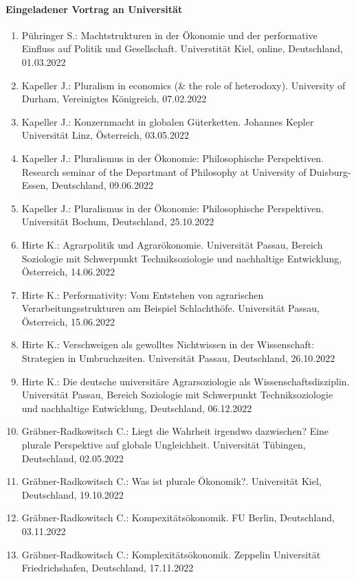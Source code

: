 \paragraph{Eingeladener Vortrag an Universität}
\begin{enumerate}
	\item Pühringer S.: Machtstrukturen in der Ökonomie und der performative Einfluss auf Politik und Gesellschaft. Universtität Kiel, online, Deutschland, 01.03.2022
	\item Kapeller J.: Pluralism in economics (& the role of heterodoxy). University of Durham, Vereinigtes Königreich, 07.02.2022
	\item Kapeller J.: Konzernmacht in globalen Güterketten. Johannes Kepler Universität Linz, Österreich, 03.05.2022
	\item Kapeller J.: Pluralismus in der Ökonomie: Philosophische Perspektiven. Research seminar of the Departmant of Philosophy at University of Duisburg-Essen, Deutschland, 09.06.2022
	\item Kapeller J.: Pluralismus in der Ökonomie: Philosophische Perspektiven. Universität Bochum, Deutschland, 25.10.2022
	\item Hirte K.: Agrarpolitik und Agrarökonomie. Universität Passau, Bereich Soziologie mit Schwerpunkt Techniksoziologie und nachhaltige Entwicklung, Österreich, 14.06.2022
	\item Hirte K.: Performativity: Vom Entstehen von agrarischen Verarbeitungsstrukturen am Beispiel Schlachthöfe. Universität Passau, Österreich, 15.06.2022
	\item Hirte K.: Verschweigen als gewolltes Nichtwissen in der Wissenschaft: Strategien in Umbruchzeiten. Universität Passau, Deutschland, 26.10.2022
	\item Hirte K.: Die deutsche universitäre Agrarsoziologie als Wissenschaftsdisziplin. Universität Passau, Bereich Soziologie mit Schwerpunkt Techniksoziologie und nachhaltige Entwicklung, Deutschland, 06.12.2022
	\item Gräbner-Radkowitsch C.: Liegt die Wahrheit irgendwo dazwischen? Eine plurale Perspektive auf globale Ungleichheit. Universität Tübingen, Deutschland, 02.05.2022
	\item Gräbner-Radkowitsch C.: Was ist plurale Ökonomik?. Universität Kiel, Deutschland, 19.10.2022
	\item Gräbner-Radkowitsch C.: Kompexitätsökonomik. FU Berlin, Deutschland, 03.11.2022
	\item Gräbner-Radkowitsch C.: Komplexitätsökonomik. Zeppelin Universität Friedrichshafen, Deutschland, 17.11.2022
\end{enumerate}
